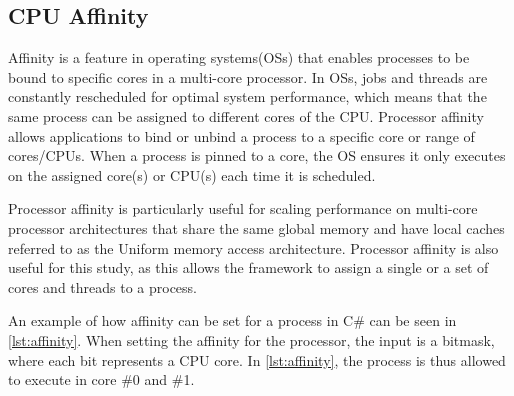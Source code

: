 \subsection{CPU Affinity}

Affinity is a feature in operating systems(OSs) that enables processes to be bound to specific cores in a multi-core processor. In OSs, jobs and threads are constantly rescheduled for optimal system performance, which means that the same process can be assigned to different cores of the CPU. Processor affinity allows applications to bind or unbind a process to a specific core or range of cores/CPUs. When a process is pinned to a core, the OS ensures it only executes on the assigned core(s) or CPU(s) each time it is scheduled.\cite{affinity}



Processor affinity is particularly useful for scaling performance on multi-core processor architectures that share the same global memory and have local caches referred to as the Uniform memory access architecture. Processor affinity is also useful for this study, as this allows the framework to assign a single or a set of cores and threads to a process.\cite{affinity}\newline

An example of how affinity can be set for a process in C\# can be seen in \cref{lst:affinity}. When setting the affinity for the processor, the input is a bitmask, where each bit represents a CPU core. In \cref{lst:affinity}, the process is thus allowed to execute in core \#0 and \#1.
